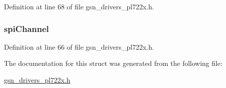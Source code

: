 Definition at line 68 of file gsn\_\-drivers\_\-pl722x.h.

\hypertarget{a00449_a83a2309a5073ea257cf95ec84fa387e5}{
\subsubsection[{spiChannel}]{ {\bf spiChannel}}}
\label{a00449_a83a2309a5073ea257cf95ec84fa387e5}


Definition at line 66 of file gsn\_\-drivers\_\-pl722x.h.



The documentation for this struct was generated from the following file:\begin{DoxyCompactItemize}
\item 
\hyperlink{a00486}{gsn\_\-drivers\_\-pl722x.h}\end{DoxyCompactItemize}

